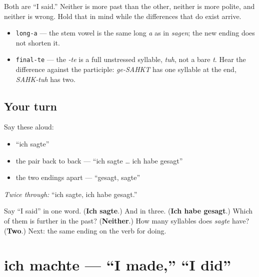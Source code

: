 Both are \textquotedblleft{}I said.\textquotedblright{} Neither is more past than the other, neither is more polite, and neither is wrong. Hold that in mind while the differences that do exist arrive.

\begin{sounds}
\begin{itemize}
\raggedright
  \item \texttt{long-a} — the stem vowel is the same long \emph{a} as in \emph{sagen}; the new ending does not shorten it.
  \item \texttt{final-te} — the \emph{-te} is a full unstressed syllable, \emph{tuh}, not a bare \emph{t}. Hear the difference against the participle: \emph{ge-SAHKT} has one syllable at the end, \emph{SAHK-tuh} has two.
\end{itemize}
\end{sounds}

\subsection*{Your turn}
Say these aloud:

\begin{itemize}
\raggedright
  \item \textquotedblleft{}ich sagte\textquotedblright{}
  \item the pair back to back — \textquotedblleft{}ich sagte … ich habe gesagt\textquotedblright{}
  \item the two endings apart — \textquotedblleft{}gesagt, sagte\textquotedblright{}
\end{itemize}

\emph{Twice through:} \textquotedblleft{}ich sagte, ich habe gesagt.\textquotedblright{}

\begin{tcolorbox}[breakable,colback=teal!4,colframe=teal!35!black,title={Before you move on}]
Say \textquotedblleft{}I said\textquotedblright{} in one word. (\textbf{Ich sagte}.) And in three. (\textbf{Ich habe gesagt}.) Which of them is further in the past? (\textbf{Neither}.) How many syllables does \emph{sagte} have? (\textbf{Two}.) Next: the same ending on the verb for doing.
\end{tcolorbox}
\section[ich machte]{ich machte — \textquotedblleft{}I made,\textquotedblright{} \textquotedblleft{}I did\textquotedblright{}}

